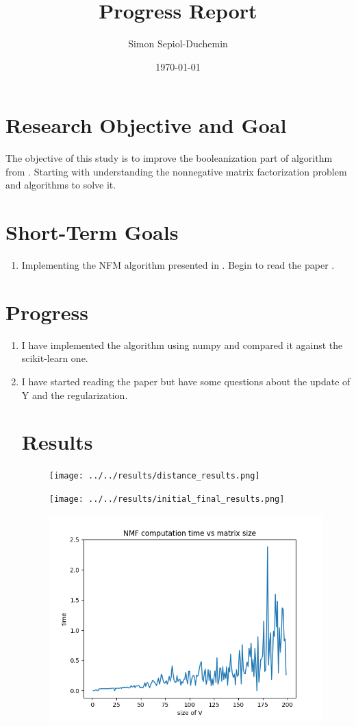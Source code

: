 \documentclass[a4paper,11pt]{article}
\title{Progress Report}
\author{Simon Sepiol-Duchemin}
\date{\today}
\begin{document}
%
\maketitle
\thispagestyle{empty}
%
\section{Research Objective and Goal}
The objective of this study is to improve the booleanization part of algorithm from \cite{9521203}. Starting with understanding the nonnegative matrix factorization problem and algorithms to solve it.
\section{Short-Term Goals}
\begin{enumerate}
\item Implementing the NFM algorithm presented in \cite{9521203}. Begin to read the paper \cite{9521203}.
\end{enumerate}
\section{Progress}
\begin{enumerate}
\item I have implemented the algorithm using numpy and compared it against the scikit-learn one.
\item I have started reading the paper but have some questions about the update of Y and the regularization. 
\section{Results}
\begin{figure}
    \texttt{[image: ../../results/distance\_results.png]}
\end{figure}
\begin{figure}
    \texttt{[image: ../../results/initial\_final\_results.png]}
\end{figure}
\begin{figure}
    \includegraphics{../../results/time_results.png}
\end{figure}
\end{enumerate}



\end{document}
